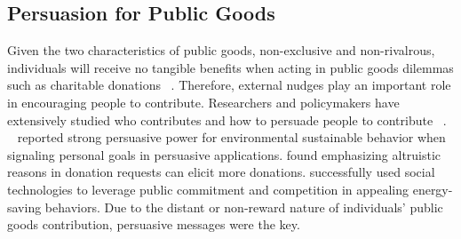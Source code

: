 \subsection{Persuasion for Public Goods}
Given the two characteristics of public goods, non-exclusive and non-rivalrous, individuals will receive no tangible benefits when acting in public goods dilemmas such as charitable donations ~\cite{marwell1981economists,isaac1982public}. Therefore, external nudges play an important role in encouraging people to contribute. Researchers and policymakers have extensively studied who contributes and how to persuade people to contribute ~\cite{olson2009logic,becker1974theory,andreoni1990impure,miguel2005ethnic,burnett1981psychographic,pessemier1977willingness,burnett1981psychographic}. ~\textcite{midden2008using} reported strong persuasive power for environmental sustainable behavior when signaling personal goals in persuasive applications. \textcite{feiler2012mixed} found emphasizing altruistic reasons in donation requests can elicit more donations. \textcite{mankoff2010stepgreen} successfully used social technologies to leverage public commitment and competition in appealing energy-saving behaviors. Due to the distant or non-reward nature of individuals' public goods contribution, persuasive messages were the key. 

